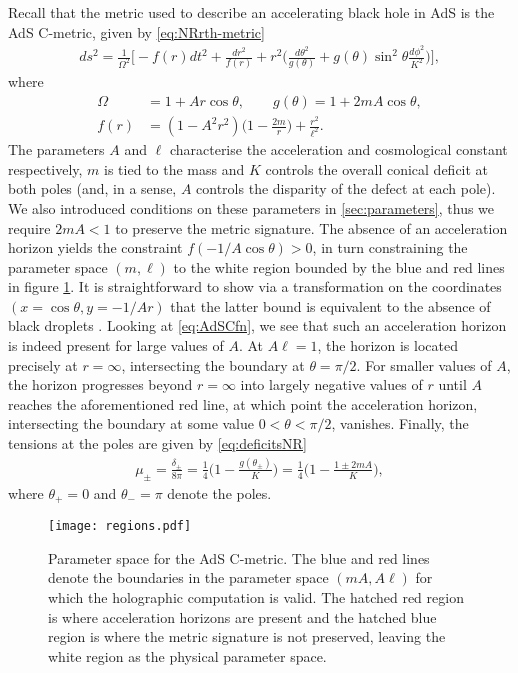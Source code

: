 \documentclass[
twoside,
openright,
frontopenright,
]{dmathesis}
\newcommand{\nn}{\nonumber}
\begin{document}
Recall that the metric used to describe an accelerating black hole in AdS is the
AdS C-metric, given by \eqref{eq:NRrth-metric}
\begin{align}\label{AdSC}
ds^2=\frac{1}{\Omega^2}\bigg[ -f(r)dt^2+\frac{dr^2}{f(r)}
+r^2\Big(\frac{d\theta^2}{g(\theta)}
+g(\theta)\sin^2\theta\frac{d\phi^2}{K^2}\Big)\bigg],
\end{align}
where
\begin{align}
  \label{eq:AdSCfn}
\Omega&=1+Ar\cos\theta, \qquad  g(\theta)= 1+2mA\cos\theta, \nn\\
f(r)&=(1-A^2r^2)\bigg(1-\frac{2m}{r}\bigg)+\frac{r^2}{\ell^2}.
\end{align}
The parameters $A$ and $\ell$ characterise the acceleration and cosmological
constant respectively, $m$ is tied to the mass and $K$ controls the overall
conical deficit at both poles (and, in a sense, $A$ controls the disparity of
the defect at each pole). We also introduced conditions on these parameters in
\cref{sec:parameters}, thus we require $2mA<1$ to preserve the metric
signature. The absence of an acceleration horizon yields the constraint
$f(-1/A\cos\theta) > 0$, in turn constraining the parameter space $(m,\ell)$ to
the white region bounded by the blue and red lines in figure \ref{fig:f1}. It is
straightforward to show via a transformation \cite{Hong:2003gx} on the
coordinates $(x=\cos\theta,y=-1/Ar)$ that the latter bound is equivalent to the
absence of black droplets \cite{Hubeny:2009kz}. Looking at \cref{eq:AdSCfn}, we
see that such an acceleration horizon is indeed present for large values of
$A$. At $A\ell=1$, the horizon is located precisely at $r=\infty$, intersecting
the boundary at $\theta=\pi/2$. For smaller values of $A$, the horizon
progresses beyond $r=\infty$ into largely negative values of $r$ until $A$
reaches the aforementioned red line, at which point the acceleration horizon,
intersecting the boundary at some value $0<\theta<\pi/2$, vanishes. Finally, the
tensions at the poles are given by \eqref{eq:deficitsNR}
\begin{align}
\label{mueq}
\mu_{\pm}=\frac{\delta_\pm}{8\pi}
=\frac{1}{4}\Big(1-\frac{g(\theta_\pm)}{K}%
\Big)=\frac{1}{4}\Big(1-\frac{1\pm 2mA}{K}\Big),
\end{align}
where $\theta_+=0$ and $\theta_-=\pi$ denote the poles.
\begin{figure}
\centering
\texttt{[image: regions.pdf]}
\caption{Parameter space for the AdS C-metric. The blue and red lines denote the
  boundaries in the parameter space $(mA,A\ell)$ for which the holographic
  computation is valid.  The hatched red region is where acceleration horizons
  are present and the hatched blue region is where the metric signature is not
  preserved, leaving the white region as the physical parameter space.}
\label{fig:f1}
\end{figure}
\end{document}
